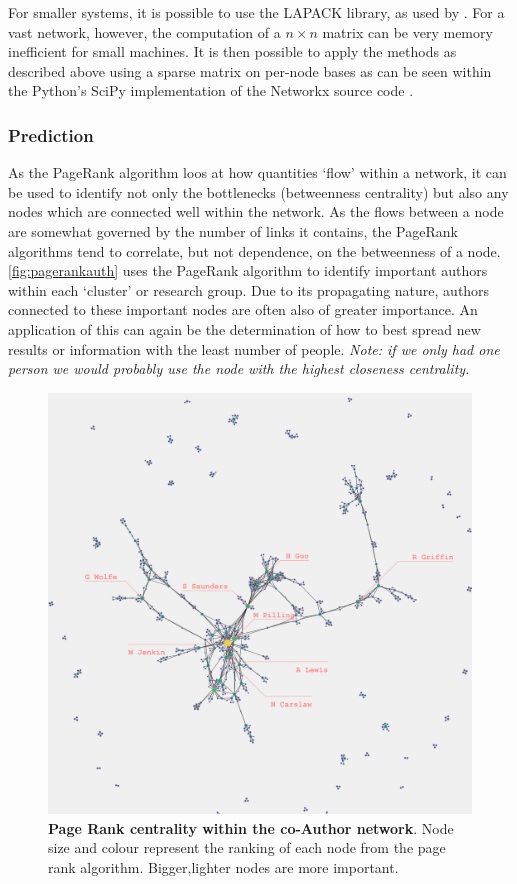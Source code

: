 For smaller systems, it is possible to use the LAPACK \citep{lapack} library, as used by \cite{numpy}. For a vast network, however, the computation of a $n \times n $ matrix can be very memory inefficient for small machines. It is then possible to apply the methods as described above using a sparse matrix on per-node bases as can be seen within the Python's SciPy implementation of the Networkx source code \citep{scipy,networkx}.

\subsubsection{Prediction}\label{sec:applypr}
As the PageRank algorithm loos at how quantities `flow' within a network, it can be used to identify not only the bottlenecks (betweenness centrality) but also any nodes which are connected well within the network. As the flows between a node are somewhat governed by the number of links it contains, the PageRank algorithms tend to correlate, but not dependence, on the betweenness of a node. \autoref{fig:pagerankauth} uses the PageRank algorithm to identify important authors within each `cluster' or research group. Due to its propagating nature, authors connected to these important nodes are often also of greater importance. An application of this can again be the determination of how to best spread new results or information with the least number of people. \textit{Note: if we only had one person we would probably use the node with the highest closeness centrality.}

\begin{figure}[H]
     \centering
         \includegraphics[width=.8\textwidth]{figures_c3/pagerankauthor.png}

        
                \caption{ \textbf{Page Rank centrality within the co-Author network}. Node size and colour represent the ranking of each node from the page rank algorithm. Bigger,lighter nodes are more important.}
        \label{fig:pagerankauth}
\end{figure}


